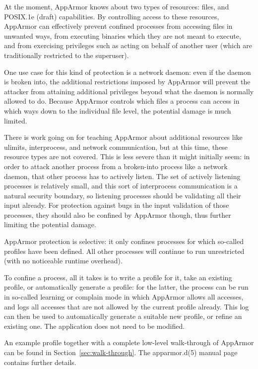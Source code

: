 \documentclass[a4paper]{article}
\begin{document}
At the moment, AppArmor knows about two types of resources: files, and
POSIX.1e (draft) capabilities.  By controlling access to these
resources, AppArmor can effectively prevent confined processes from
accessing files in unwanted ways, from executing binaries which they are
not meant to execute, and from exercising privileges such as acting on
behalf of another user (which are traditionally restricted to the
superuser).

One use case for this kind of protection is a network daemon: even if
the daemon is broken into, the additional restrictions imposed by
AppArmor will prevent the attacker from attaining additional privileges
beyond what the daemon is normally allowed to do.  Because AppArmor
controls which files a process can access in which ways down to the
individual file level, the potential damage is much limited.

There is work going on for teaching AppArmor about additional resources
like ulimits, interprocess, and network communication, but at this time,
these resource types are not covered.  This is less severe than it might
initially seem: in order to attack another process from a broken-into
process like a network daemon, that other process has to actively
listen.  The set of actively listening processes is relatively small,
and this sort of interprocess communication is a natural security
boundary, so listening processes should be validating all their input
already.  For protection against bugs in the input validation of those
processes, they should also be confined by AppArmor though, thus further
limiting the potential damage.

AppArmor protection is selective: it only confines processes for which
so-called profiles have been defined.  All other processes will continue
to run unrestricted (with no noticeable runtime overhead).

To confine a process, all it takes is to write a profile for it, take an
existing profile, or automatically generate a profile: for the latter,
the process can be run in so-called learning or complain mode in which
AppArmor allows all accesses, and logs all accesses that are not allowed
by the current profile already. This log can then be used to
automatically generate a suitable new profile, or refine an existing one.
The application does not need to be modified.

An example profile together with a complete low-level walk-through of
AppArmor can be found in Section~\ref{sec:walk-through}.  The
apparmor.d(5) manual page contains further details.
\end{document}
